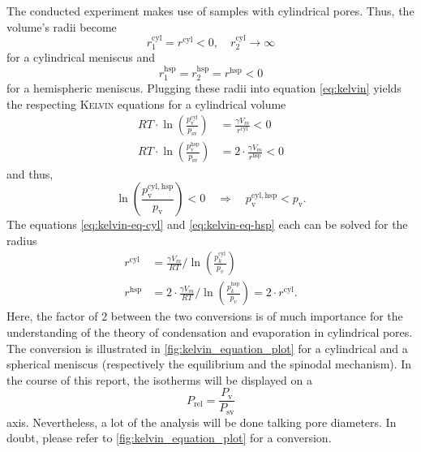\documentclass[../thesis.tex]{subfiles}
\begin{document}
    The conducted experiment makes use of samples with cylindrical pores. Thus, the volume's radii become
    \begin{equation*}
        r_1^\mathrm{cyl}=r^\mathrm{cyl}<0, \quad r_2^\mathrm{cyl} \rightarrow \infty
        \label{eq:radii-cyl}
    \end{equation*}
    for a cylindrical meniscus and
    \begin{equation*}
        r_1^\mathrm{hsp}=r_2^\mathrm{hsp}=r^\mathrm{hsp}<0
        \label{eq:radii-hsp}
    \end{equation*}
    for a hemispheric meniscus. Plugging these radii into equation \cref{eq:kelvin} yields the respecting \textsc{Kelvin} equations for a cylindrical volume
    \begin{align}
        RT\cdot \ln{\left(\frac{p_\mathrm{v}^\mathrm{cyl}}{p_\mathrm{sv}}\right)} &= \frac{\gamma V_m}{r^\mathrm{cyl}} < 0 \label{eq:kelvin-eq-cyl}   \\
        RT\cdot \ln{\left(\frac{p_\mathrm{v}^\mathrm{hsp}}{p_\mathrm{sv}}\right)} &= 2\cdot \frac{\gamma V_m}{r^\mathrm{hsp}} < 0
        \label{eq:kelvin-eq-hsp}
    \end{align}
    and thus,
    \begin{equation*}
        \ln{\left(\frac{p_\mathrm{v}^\mathrm{cyl,hsp}}{p_\mathrm{v}}\right)} < 0\quad \Longrightarrow\quad p_\mathrm{v}^\mathrm{cyl,hsp} < p_\mathrm{v}.
    \end{equation*}
    The equations \cref{eq:kelvin-eq-cyl} and \cref{eq:kelvin-eq-hsp} each can be solved for the radius
    \begin{align}
        r^\mathrm{cyl} &= \frac{\gamma V_m}{RT} / \ln{\left(\frac{p_k^\mathrm{cyl}}{p_v}\right)}  \\
        r^\mathrm{hsp} &= 2\cdot \frac{\gamma V_m}{RT} / \ln{\left(\frac{p_k^\mathrm{hsp}}{p_v}\right)} = 2\cdot r^\mathrm{cyl}.
    \end{align}
    Here, the factor of $2$ between the two conversions is of much importance for the understanding of the theory of condensation and evaporation in cylindrical pores. The conversion is illustrated in \cref{fig:kelvin_equation_plot} for a cylindrical and a spherical meniscus (respectively the equilibrium and the spinodal mechanism). In the course of this report, the isotherms will be displayed on a
    \begin{equation}
      P_\mathrm{rel}=\frac{P_\mathrm{v}}{P_\mathrm{sv}}
    \end{equation}
    axis. Nevertheless, a lot of the analysis will be done talking pore diameters. In doubt, please refer to \cref{fig:kelvin_equation_plot} for a conversion.

    
\end{document}
